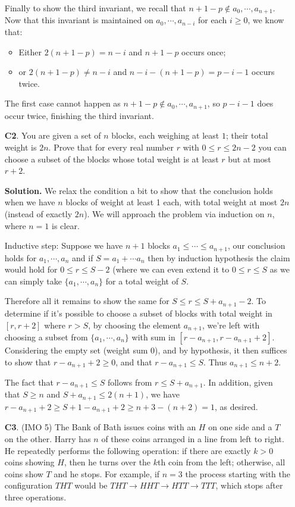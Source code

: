 \documentclass[11pt,a4paper]{article}
\begin{document}
\begin{enumerate}
	Finally to show the third invariant, we recall that $n+1-p\not\in a_0, \cdots , a_{n+1}$. Now that this invariant is maintained on $a_0, \cdots, a_{n-i}$ for each $i\ge 0$, we know that: 
	\begin{itemize}
		\item Either $2(n+1-p)=n-i$ and $n+1-p$ occurs once; 
		\item or $2(n+1-p)\neq n-i$ and $n-i-(n+1-p)=p-i-1$ occurs twice. 
	\end{itemize}
	The first case cannot happen as $n+1-p\not\in a_0, \cdots , a_{n+1}$, so $p-i-1$ does occur twice, finishing the third invariant. 
	
	\item [\textbf{C2}.] You are given a set of $n$ blocks, each weighing at least $1$; their total weight is $2n$. Prove that for every real number $r$ with $0 \leq r \leq 2n-2$ you can choose a subset of the blocks whose total weight is at least $r$ but at most $r + 2$.
	
	\textbf{Solution.} We relax the condition a bit to show that the conclusion holds when we have $n$ blocks of weight at least 1 each, with total weight at most $2n$ (instead of exactly $2n$). 
	We will approach the problem via induction on $n$, where $n=1$ is clear. 
	
	Inductive step: Suppose we have $n+1$ blocks $a_1\le \cdots \le a_{n+1}$, our conclusion holds for $a_1, \cdots , a_n$ and if $S=a_1+\cdots a_n$ then by induction hypothesis the claim would hold for $0\le r\le S-2$ (where we can even extend it to $0\le r\le S$ as we can simply take $\{a_1, \cdots, a_n\}$ for a total weight of $S$.
	
	Therefore all it remains to show the same for $S\le r\le S+a_{n+1}-2$. To determine if it's possible to choose a subset of blocks with total weight in $[r, r+2]$ where $r>S$, by choosing the element $a_{n+1}$, we're left with choosing a subset from $\{a_1, \cdots , a_n\}$ with sum in $[r-a_{n+1}, r-a_{n+1}+2]$. Considering the empty set (weight sum 0), and by hypothesis, it then suffices to show that $r-a_{n+1}+2\ge 0$, and that $r-a_{n+1}\le S$. Thus $a_{n+1}\le n+2$.
	
	The fact that $r-a_{n+1}\le S$ follows from $r\le S+a_{n+1}$. In addition, given that $S\ge n$ and $S+a_{n+1}\le 2(n+1)$, we have $r-a_{n+1}+2\ge S+1-a_{n+1}+2\ge n+3-(n+2)=1$, as desired.
	
	\item [\textbf{C3}.] (IMO 5) The Bank of Bath issues coins with an $H$ on one side and a $T$ on the other. Harry has $n$ of these coins arranged in a line from left to right. He repeatedly performs the following operation: if there are exactly $k>0$ coins showing $H$, then he turns over the $k$th coin from the left; otherwise, all coins show $T$ and he stops. For example, if $n=3$ the process starting with the configuration $THT$ would be $THT \to HHT  \to HTT \to TTT$, which stops after three operations.
	

\end{enumerate}
\end{document}
